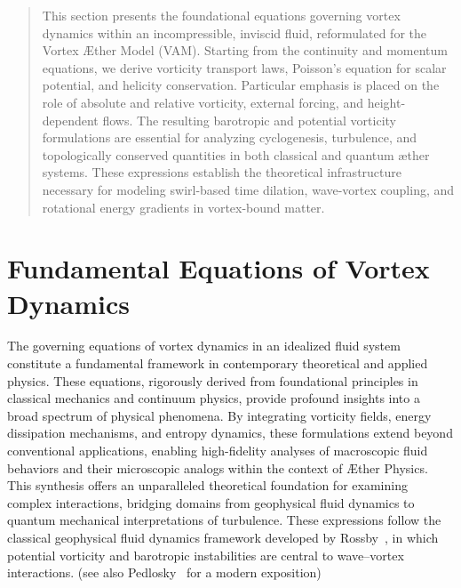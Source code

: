 \documentclass[12pt]{article}
\begin{document}
    \titlepageOpen

    \begin{abstract}
        This section presents the foundational equations governing vortex dynamics within an incompressible, inviscid fluid, reformulated for the Vortex Æther Model (VAM). Starting from the continuity and momentum equations, we derive vorticity transport laws, Poisson’s equation for scalar potential, and helicity conservation. Particular emphasis is placed on the role of absolute and relative vorticity, external forcing, and height-dependent flows. The resulting barotropic and potential vorticity formulations are essential for analyzing cyclogenesis, turbulence, and topologically conserved quantities in both classical and quantum æther systems. These expressions establish the theoretical infrastructure necessary for modeling swirl-based time dilation, wave-vortex coupling, and rotational energy gradients in vortex-bound matter.
    \end{abstract}

    \titlepageClose
    \fi

    \section{Fundamental Equations of Vortex Dynamics}

    The governing equations of vortex dynamics in an idealized fluid system constitute a fundamental framework in contemporary theoretical and
    applied physics. These equations, rigorously derived from foundational principles in classical mechanics and continuum physics, provide
    profound insights into a broad spectrum of physical phenomena. By integrating vorticity fields, energy dissipation mechanisms, and entropy dynamics, these formulations extend beyond conventional applications, enabling high-fidelity analyses of macroscopic fluid behaviors and their microscopic analogs within the context of Æther Physics. This synthesis offers an unparalleled theoretical foundation for examining complex interactions, bridging domains from geophysical fluid dynamics to quantum mechanical interpretations of turbulence. These expressions follow the classical geophysical fluid dynamics framework developed by Rossby~\cite{rossby1939}, in which potential vorticity and barotropic instabilities are central to wave–vortex interactions. (see also Pedlosky~\cite{pedlosky1987} for a modern exposition)
\end{document}
